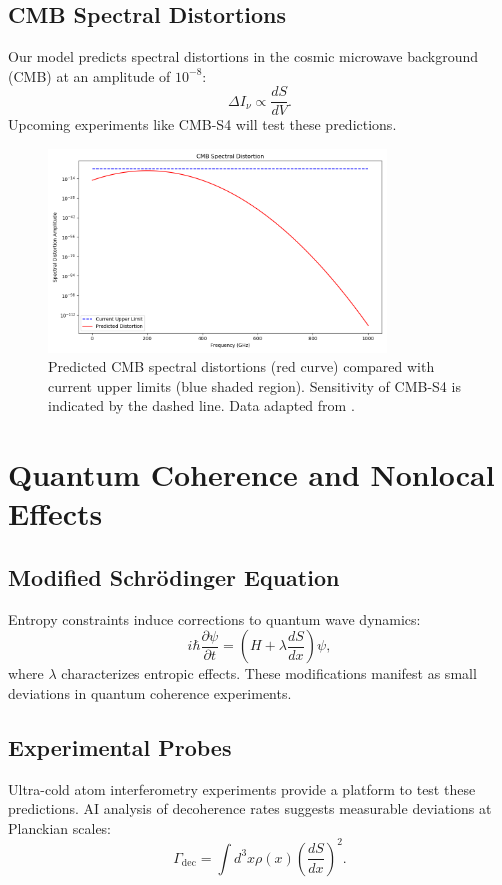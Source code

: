 \documentclass[12pt]{article}
\begin{document}
\subsection{CMB Spectral Distortions}
Our model predicts spectral distortions in the cosmic microwave background (CMB) at an amplitude of $10^{-8}$:
\begin{equation}
\Delta I_\nu \propto \frac{dS}{dV}.
\end{equation}
Upcoming experiments like CMB-S4 \cite{CMB-S42023} will test these predictions.

\begin{figure}[h!]
    \centering
    \includegraphics[width=0.8\textwidth]{cmb_spectral_distortion.png} %
    \caption{Predicted CMB spectral distortions (red curve) compared with current upper limits (blue shaded region). Sensitivity of CMB-S4 is indicated by the dashed line. Data adapted from \cite{CMB-S42023}.}
    \label{fig:cmb_spectral_distortion}
\end{figure}

\section{Quantum Coherence and Nonlocal Effects}
\subsection{Modified Schrödinger Equation}
Entropy constraints induce corrections to quantum wave dynamics:
\begin{equation}
i \hbar \frac{\partial \psi}{\partial t} = \left(H + \lambda \frac{dS}{dx}\right) \psi,
\end{equation}
where $\lambda$ characterizes entropic effects. These modifications manifest as small deviations in quantum coherence experiments.

\subsection{Experimental Probes}
Ultra-cold atom interferometry experiments \cite{Kasevich2023} provide a platform to test these predictions. AI analysis of decoherence rates suggests measurable deviations at Planckian scales:
\begin{equation}
\Gamma_{\text{dec}} = \int d^3x \rho(x) \left(\frac{dS}{dx}\right)^2.
\end{equation}
\end{document}
